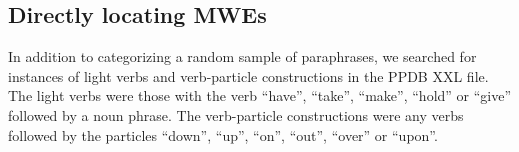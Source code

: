 \documentclass[11pt]{article}
\begin{document}
%
%
%


\subsection{Directly locating MWEs}

In addition to categorizing a random sample of paraphrases, we searched for instances of light verbs and verb-particle constructions in the PPDB XXL file. The light verbs were those with the verb ``have'', ``take'', ``make'', ``hold'' or ``give'' followed by a noun phrase. The verb-particle constructions were any verbs followed by the particles ``down'', ``up'', ``on'', ``out'', ``over'' or ``upon''. 
\end{document}
